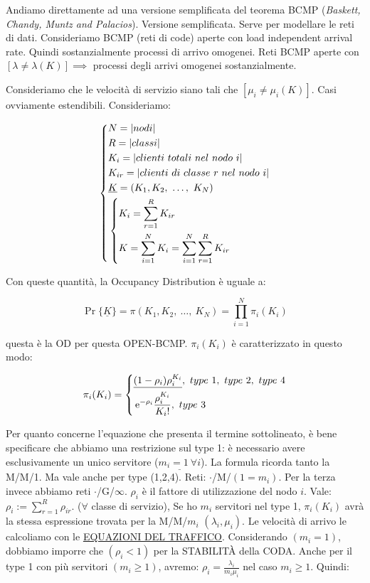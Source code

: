 Andiamo direttamente ad una versione semplificata del teorema BCMP (\textit{Baskett, Chandy, Muntz and Palacios}). Versione semplificata. Serve per modellare le reti di dati. Consideriamo BCMP (reti di code) aperte con load independent arrival rate. Quindi sostanzialmente processi di arrivo omogenei. Reti BCMP aperte con $[\lambda\neq\lambda(K)] \implies$ processi degli arrivi omogenei sostanzialmente.

Consideriamo che le velocità di servizio siano tali che $[\mu_i\neq\mu_i(K)]$. Casi ovviamente estendibili. Consideriamo:

\[
	\left\{
	\begin{aligned}
	&N=\left\vert{nodi}\right\vert\\
	&R=\left\vert{classi}\right\vert\\
	&K_i=\left\vert{clienti\ totali\ nel\ nodo\ i}\right\vert\\
	&K_{ir}=\left\vert{clienti\ di\ classe\ r\ nel\ nodo\ i}\right\vert\\
	&\underline{K}=(K_1,K_2,\ \dots,\ K_N)\\
	&\left\{
	\begin{aligned}
	&K_i=\sum_{r=1}^R{K_{ir}}\\
	&K=\sum_{i=1}^N{K_i} = \sum_{i=1}^N{\sum_{r=1}^R{K_{ir}}}
	\end{aligned}
	\right.
	\end{aligned}
	\right.
\]

Con queste quantità, la Occupancy Distribution è uguale a:

\[
	\Pr\{\underline{K}\} = \pi(K_1,K_2,\ \dots,\ K_N) = \prod_{i=1}^N{\pi_i(K_i)}
\]

questa è la OD per questa OPEN-BCMP. $\pi_i(K_i)$ è caratterizzato in questo modo:

\[
	\pi_i(K_i) = \left\{
	\begin{aligned}
	&\underline{(1-\rho_i)\rho_i^{K_i}},\ type\ 1,\ type\ 2,\ type\ 4\\
	&\e^{-\rho_i}\frac{\rho_i^{K_i}}{K_i!},\ type\ 3
	\end{aligned}
	\right.
\]

Per quanto concerne l'equazione che presenta il termine sottolineato, è bene specificare che abbiamo una restrizione sul type 1: è necessario avere esclusivamente un unico servitore ($\underline{m_i=1\ \forall i}$). La formula ricorda tanto la M/M/1. Ma vale anche per type (1,2,4). Reti: $\mathord{\cdot}$/M/$(1=m_i)$. Per la terza invece abbiamo reti $\mathord{\cdot}$/G/$\infty$. $\rho_i$ è il fattore di utilizzazione del nodo $i$. Vale: $\rho_i := \sum_{r=1}^R{\rho_{ir}}$. ($\forall$ classe di servizio), Se ho $m_i$ servitori nel type 1, $\pi_i(K_i)$ avrà la stessa espressione trovata per la M/M/$m_i$ $(\lambda_i,\mu_i)$. Le velocità di arrivo le calcoliamo con le \underline{EQUAZIONI DEL TRAFFICO}. Considerando $(m_i=1)$, dobbiamo imporre che $(\rho_i<1)$ per la STABILIT\`A della CODA. Anche per il type 1 con più servitori $(m_i\geq 1)$, avremo: $\rho_i=\frac{\lambda_i}{m_i\mu_i}$ nel caso $m_i\geq 1$. Quindi:


